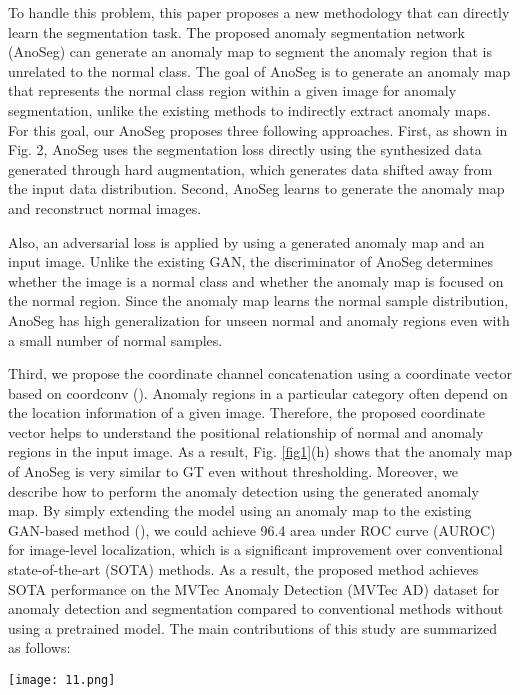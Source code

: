 \documentclass{article} \usepackage{iclr2022_conference,times}
\begin{document}
To handle this problem, this paper proposes a new methodology that can directly learn the segmentation task. The proposed anomaly segmentation network (AnoSeg) can generate an anomaly map to segment the anomaly region that is unrelated to the normal class. The goal of AnoSeg is to generate an anomaly map that represents the normal class region within a given image for anomaly segmentation, unlike the existing methods to indirectly extract anomaly maps. For this goal, our AnoSeg proposes three following approaches. First, as shown in Fig. 2, AnoSeg uses the segmentation loss directly using the synthesized data generated through hard augmentation, which generates data shifted away from the input data distribution. Second, AnoSeg learns to generate the anomaly map and reconstruct normal images. 

Also, an adversarial loss is applied by using a generated anomaly map and an input image. Unlike the existing GAN, the discriminator of AnoSeg determines whether the image is a normal class and whether the anomaly map is focused on the normal region. Since the anomaly map learns the normal sample distribution, AnoSeg has high generalization for unseen normal and anomaly regions even with a small number of normal samples. 

Third, we propose the coordinate channel concatenation using a coordinate vector based on coordconv (\cite{coord}). Anomaly regions in a particular category often depend on the location information of a given image. Therefore, the proposed coordinate vector helps to understand the positional relationship of normal and anomaly regions in the input image. As a result, Fig. \ref{fig1}(h) shows that the anomaly map of AnoSeg is very similar to GT even without thresholding. Moreover, we describe how to perform the anomaly detection using the generated anomaly map. By simply extending the model using an anomaly map to the existing GAN-based method (\cite{alocc}), we could achieve 96.4 area under ROC curve (AUROC) for image-level localization, which is a significant improvement over conventional state-of-the-art (SOTA) methods. As a result, the proposed method achieves SOTA performance on the MVTec Anomaly Detection (MVTec AD) dataset for anomaly detection and segmentation compared to conventional methods without using a pretrained model. The main contributions of this study are summarized as follows:

\begin{figure*}[t]
\begin{center}
\texttt{[image: 11.png]} 
\end{center}
\vspace{-0.3cm}
   \caption{Comparison of anomaly maps (before thresholding) of the proposed method with the SOTA methods in the MVTec-AD dataset. Except for the proposed method, anomaly maps of existing methods are normalized to [0, 1].}
\label{fig1}
\vspace{-0.4cm}
\end{figure*}
\end{document}
